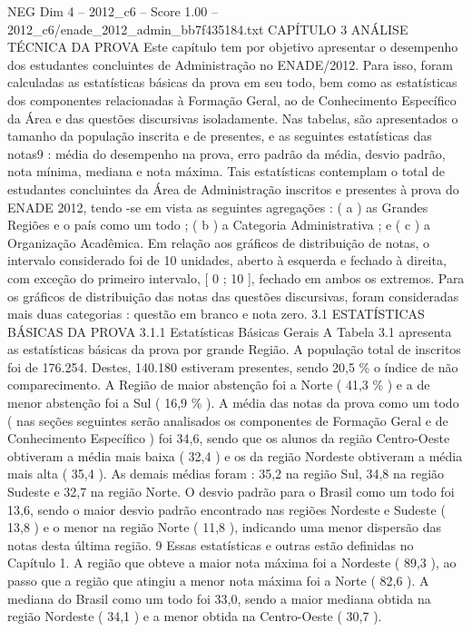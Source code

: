 \begin{textsample}{NEG Dim 4 – 2012\_c6 – Score 1.00 – 2012\_c6/enade\_2012\_admin\_bb7f435184.txt}  \label{ex:f4_neg_232}
CAPÍTULO 3 ANÁLISE TÉCNICA DA PROVA Este capítulo tem por objetivo apresentar o desempenho dos estudantes concluintes de Administração no ENADE/2012.
Para isso, foram calculadas as estatísticas básicas da prova em seu todo, bem como as estatísticas dos componentes relacionadas à Formação Geral, ao de Conhecimento Específico da Área e das questões discursivas isoladamente.
Nas tabelas, são apresentados o tamanho da população inscrita e de presentes, e as seguintes estatísticas das notas9 : média do desempenho na prova, erro padrão da média, desvio padrão, nota mínima, mediana e nota máxima.
Tais estatísticas contemplam o total de estudantes concluintes da Área de Administração inscritos e presentes à prova do ENADE 2012, tendo -se em vista as seguintes agregações : ( a ) as Grandes Regiões e o país como um todo ; ( b ) a Categoria Administrativa ; e ( c ) a Organização Acadêmica.
Em relação aos gráficos de distribuição de notas, o intervalo considerado foi de 10 unidades, aberto à esquerda e fechado à direita, com exceção do primeiro intervalo, [ 0 ; 10 ], fechado em ambos os extremos.
Para os gráficos de distribuição das notas das questões discursivas, foram consideradas mais duas categorias : questão em branco e nota zero. 3.1 ESTATÍSTICAS BÁSICAS DA PROVA 3.1.1 Estatísticas Básicas Gerais A Tabela 3.1 apresenta as estatísticas básicas da prova por grande Região.
A população total de inscritos foi de 176.254.
Destes, 140.180 estiveram presentes, sendo 20,5 \% o índice de não comparecimento.
A Região de maior abstenção foi a Norte ( 41,3 \% ) e a de menor abstenção foi a Sul ( 16,9 \% ).
A média das notas da prova como um todo ( nas seções seguintes serão analisados os componentes de Formação Geral e de Conhecimento Específico ) foi 34,6, sendo que os alunos da região Centro-Oeste obtiveram a média mais baixa ( 32,4 ) e os da região Nordeste obtiveram a média mais alta ( 35,4 ).
As demais médias foram : 35,2 na região Sul, 34,8 na região Sudeste e 32,7 na região Norte.
O desvio padrão para o Brasil como um todo foi 13,6, sendo o maior desvio padrão encontrado nas regiões Nordeste e Sudeste ( 13,8 ) e o menor na região Norte ( 11,8 ), indicando uma menor dispersão das notas desta última região. 9 Essas estatísticas e outras estão definidas no Capítulo 1.
A região que obteve a maior nota máxima foi a Nordeste ( 89,3 ), ao passo que a região que atingiu a menor nota máxima foi a Norte ( 82,6 ).
A mediana do Brasil como um todo foi 33,0, sendo a maior mediana obtida na região Nordeste ( 34,1 ) e a menor obtida na Centro-Oeste ( 30,7 ).

\end{textsample}
